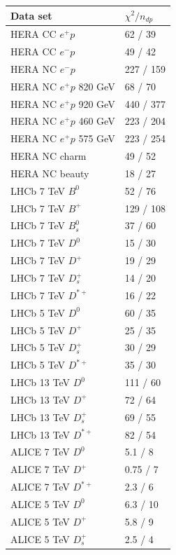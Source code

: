 \begin{table}
\renewcommand*{\arraystretch}{1.12}
    \centering
\begin{tabular}{ll}
    Data set & $\chi^2/n_{dp}$ \\
    \hline
    HERA CC $e^{+}p$ & 62 / 39  \\ 
    HERA CC $e^{-}p$ & 49 / 42  \\ 
    HERA NC $e^{-}p$ & 227 / 159  \\ 
    HERA NC $e^{+}p$ 820 GeV & 68 / 70  \\ 
    HERA NC $e^{+}p$ 920 GeV & 440 / 377  \\ 
    HERA NC $e^{+}p$ 460 GeV & 223 / 204  \\ 
    HERA NC $e^{+}p$ 575 GeV & 223 / 254  \\ 
    HERA NC charm & 49 / 52  \\ 
    HERA NC beauty & 18 / 27  \\ 
    LHCb 7 TeV $B^0$ & 52 / 76  \\ 
    LHCb 7 TeV $B^{+}$ & 129 / 108  \\ 
    LHCb 7 TeV $B^{0}_s$ & 37 / 60  \\ 
    LHCb 7 TeV $D^0$ & 15 / 30  \\ 
    LHCb 7 TeV $D^{+}$ & 19 / 29  \\ 
    LHCb 7 TeV $D^{+}_{s}$ & 14 / 20  \\ 
    LHCb 7 TeV $D^{*+}$ & 16 / 22  \\ 
    LHCb 5 TeV $D^0$ & 60 / 35  \\ 
    LHCb 5 TeV $D^{+}$ & 25 / 35  \\ 
    LHCb 5 TeV $D^{+}_{s}$ & 30 / 29  \\ 
    LHCb 5 TeV $D^{*+}$ & 35 / 30  \\ 
    LHCb 13 TeV $D^0$ & 111 / 60  \\ 
    LHCb 13 TeV $D^{+}$ & 72 / 64  \\ 
    LHCb 13 TeV $D^{+}_{s}$ & 69 / 55  \\ 
    LHCb 13 TeV $D^{*+}$ & 82 / 54  \\ 
    ALICE 7 TeV $D^0$ & 5.1 / 8  \\ 
    ALICE 7 TeV $D^{+}$ & 0.75 / 7  \\ 
    ALICE 7 TeV $D^{*+}$ & 2.3 / 6  \\ 
    ALICE 5 TeV $D^0$ & 6.3 / 10  \\ 
    ALICE 5 TeV $D^{+}$ & 5.8 / 9  \\ 
    ALICE 5 TeV $D^{+}_{s}$ & 2.5 / 4  \\ 

\end{tabular}
\end{table}

